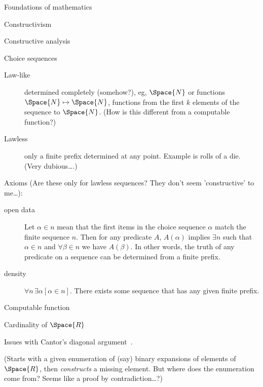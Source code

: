 \begin{plSection}{Foundations of mathematics}
\begin{plSection}{Constructivism}
\begin{plSection}{Constructive analysis}
\end{plSection}%
\begin{plSection}{Choice sequences}
\label{sec:Choice_sequences}

\begin{description}
\item[Law-like] determined completely (somehow?),
eg, $\Space{N}$ or functions $\Space{N} \mapsto \Space{N}$,
functions from the first $k$ elements of the sequence to 
$\Space{N}$.
(How is this different from a computable function?)
\item[Lawless] only a finite prefix determined at any point.
Example is rolls of a die. (Very dubious\ldots.)
\end{description}

Axioms 
(Are these only for lawless sequences?
They don't seem 'constructive' to me\ldots):
\begin{description}
\item[open data] Let $\alpha \in n$ mean that the first items
in the choice sequence $\alpha$ match the finite sequence $n$.
Then for any predicate $A$,
$A(\alpha )$ implies  $\exists n$ such that
$\alpha \in n$ and $\forall \beta \in n$ we have $A(\beta )$.
In other words, the truth of any predicate on a sequence can be
determined from a finite prefix.
\item[density] $\forall n\,\exists \alpha [\alpha \in n]$.
There exists some sequence that has any given finite prefix.
\end{description}

\end{plSection}%
\begin{plSection}{Computable function}
\label{sec:Computable_function}
\cite{wiki:ComputableFunction}

\end{plSection}%
\begin{plSection}{Cardinality of \texorpdfstring{$\Space{R}$}{R}}
\label{sec:Cardinality_of_R}

Issues with Cantor's diagonal 
argument~\cite{wiki:CantorsDiagonalArgument}.

(Starts with a given enumeration of (say) binary expansions of 
elements of $\Space{R}$, then \textit{constructs} a missing
element. But where does the enumeration come from?
Seems like a proof by contradiction\ldots?)


\end{plSection}
\end{plSection}
\end{plSection}
